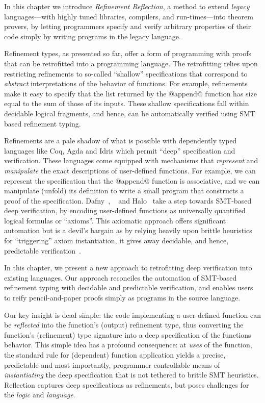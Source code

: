 In this chapter we introduce \emph{Refinement Reflection}, a method
to extend \emph{legacy} languages---with highly tuned
libraries, compilers, and run-times---into theorem provers,
by letting programmers specify and verify
arbitrary properties of their code simply
by writing programs in the legacy language.

Refinement types, as presented so far, offer a
form of programming with proofs that can be
retrofitted into a programming language.
%
The retrofitting relies upon restricting refinements
to so-called ``shallow'' specifications that
correspond to \emph{abstract} interpretations
of the behavior of functions.
%
For example, refinements make it easy to specify
that the list returned by the @append@ function
has size equal to the sum of those of its inputs.
%
These shallow specifications fall within decidable
logical fragments, and hence, can be automatically
verified using SMT based refinement typing.

Refinements are a pale shadow of what is possible
with dependently typed languages like Coq, Agda
and Idris which permit ``deep'' specification
and verification.
%
These languages come equipped with mechanisms
that \emph{represent} and \emph{manipulate} the
exact descriptions of user-defined functions.
%
For example, we can represent the specification
that the @append@ function is associative, and we
can manipulate (unfold) its definition to write a
small program that constructs a proof of the
specification.
%
Dafny~\citep{dafny}, \fstar~\citep{fstar} and
Halo~\citep{halo} take a step towards
SMT-based deep verification, by encoding
user-defined functions as universally
quantified logical formulas or ``axioms''.
%
This axiomatic approach offers significant automation
but is a devil's bargain as by relying heavily upon
brittle heuristics for ``triggering'' axiom instantiation,
it gives away decidable, and hence, predictable
verification~\citep{Leino16}.
%

In this chapter, we present a new approach to retrofitting
deep verification into existing languages. Our approach
reconciles the automation of SMT-based refinement typing
with decidable and predictable verification, and enables
users to reify pencil-and-paper proofs simply
as programs in the source language.

%
Our key insight is dead simple: the ​code
implementing a​ user-defined function can
be \emph{reflected}​ into the function's
(output) refinement type, thus converting
the function's (refinement) type signature
into a deep specification of the functions
behavior.
%
This simple idea has a profound consequence:
at \emph{uses} of the function, the standard
rule for (dependent) function application
yields a precise, predictable and most
importantly, programmer controllable
means of \emph{instantiating} the deep
specification that is not tethered to
brittle SMT heuristics.
%
Reflection captures deep specifications as
refinements, but poses challenges for the
\emph{logic} and \emph{language}.

